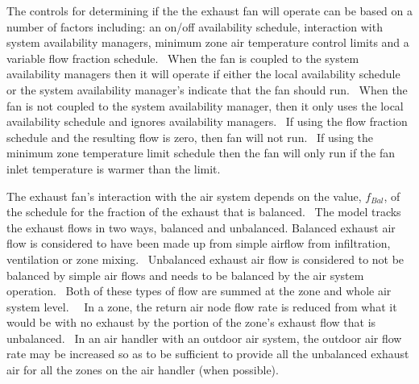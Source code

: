 The controls for determining if the the exhaust fan will operate can be based on a number of factors including: an on/off availability schedule, interaction with system availability managers, minimum zone air temperature control limits and a variable flow fraction schedule.~ When the fan is coupled to the system availability managers then it will operate if either the local availability schedule or the system availability manager's indicate that the fan should run.~ When the fan is not coupled to the system availability manager, then it only uses the local availability schedule and ignores availability managers.~ If using the flow fraction schedule and the resulting flow is zero, then fan will not run.~ If using the minimum zone temperature limit schedule then the fan will only run if the fan inlet temperature is warmer than the limit.

The exhaust fan's interaction with the air system depends on the value, \({f_{Bal}}\), of the schedule for the fraction of the exhaust that is balanced.~ The model tracks the exhaust flows in two ways, balanced and unbalanced. Balanced exhaust air flow is considered to have been made up from simple airflow from infiltration, ventilation or zone mixing.~ Unbalanced exhaust air flow is considered to not be balanced by simple air flows and needs to be balanced by the air system operation.~ Both of these types of flow are summed at the zone and whole air system level.~~ In a zone, the return air node flow rate is reduced from what it would be with no exhaust by the portion of the zone's exhaust flow that is unbalanced.~ In an air handler with an outdoor air system, the outdoor air flow rate may be increased so as to be sufficient to provide all the unbalanced exhaust air for all the zones on the air handler (when possible).
